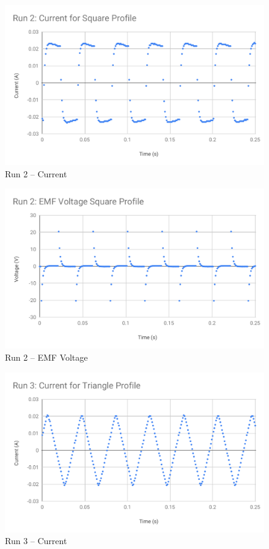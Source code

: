 %
\begin{figure}[ht]
	\centering
	\includegraphics[scale=0.74]{image/04-faraday/run-2-I.pdf}
	\caption{Run 2 -- Current}
	\label{figure.04.run.2.I}
\end{figure}
%
\begin{figure}[ht]
	\centering
	\includegraphics[scale=0.74]{image/04-faraday/run-2-V.pdf}
	\caption{Run 2 -- EMF Voltage}
	\label{figure.04.run.2.V}
\end{figure}
%
\begin{figure}[ht]
	\centering
	\includegraphics[scale=0.74]{image/04-faraday/run-3-I.pdf}
	\caption{Run 3 -- Current}
	\label{figure.04.run.3.I}
\end{figure}
